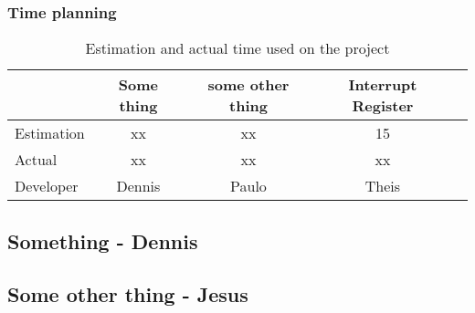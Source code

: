 \subsubsection{Time planning}
\begin{table}[H]
\centering
	\begin{tabular}{|l|c|c|c|c|}
		\hline
		~			& Some thing	& some other thing	& Interrupt Register\\ \hline
		Estimation	& xx			& xx				& 15				\\
		Actual		& xx			& xx				& xx				\\
		Developer	& Dennis		& Paulo				& Theis				\\
		\hline
	\end{tabular}
	\caption{Estimation and actual time used on the project}
\end{table}

\subsection{Something - Dennis}

%
%
%
%
%
%
%
%

\subsection{Some other thing - Jesus}

